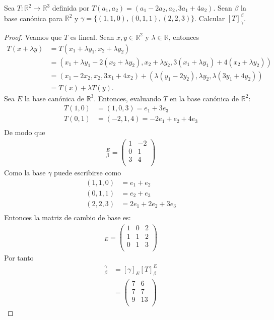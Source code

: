 \documentclass[11pt]{article}
\numberwithin{equation}{section}
\newcommand{\R}{\mathbb{R}}
\begin{document}
\begin{Problema}{} Sea $T: \R^2 \to \R^3$ definida por $T(a_1, a_2) = (a_1 - 2a_2, a_2, 3a_1 + 4a_2)$. 
    Sean $\beta$ la base canónica para $\R^2$ y $\gamma = \{(1,1,0), (0,1,1), (2,2,3)\}$. Calcular $[T]_{\gamma}^\beta$.
\end{Problema}
\begin{proof}
Veamos que $T$ es lineal. Sean $x,y \in \R^2$ y $\lambda \in \R$, entonces
\begin{align*}
    T(x+\lambda y) &=T(x_1+\lambda y_1, x_2 +\lambda y_2) \\
    &= (x_1 + \lambda y_1 - 2(x_2+\lambda y_2), x_2 + \lambda y_2, 3(x_1+\lambda y_1) + 4(x_2+\lambda y_2))\\
    &= (x_1 - 2x_2, x_2, 3x_1 + 4x_2)+(\lambda(y_1-2y_2), \lambda y_2, \lambda(3y_1+4y_2)) \\
    &= T(x) + \lambda T(y).
\end{align*}
Sea $E$ la base canónica de $\R^3$. Entonces, evaluando $T$ en la base canónica de $\R^2$:
\begin{align*}
    T(1,0)&=(1,0,3)=e_1+3e_3\\
    T(0,1)&=(-2,1,4)=-2e_1+e_2+4e_3\\
\end{align*}
De modo que 
\begin{align*}
    [T]_\beta^E=\begin{pmatrix}
        1 & -2 \\
        0 & 1 \\
        3 & 4 \\
    \end{pmatrix}
\end{align*}
Como la base $\gamma$ puede escribirse como 
\begin{align*}
    (1,1,0)&=e_1+e_2 \\
    (0,1,1)&=e_2+e_3 \\
    (2,2,3)&=2e_1+2e_2+3e_3 \\
\end{align*}
Entonces la matriz de cambio de base es:
\begin{align*}
    [\gamma]_{E}=\begin{pmatrix}
        1 & 0 & 2 \\
        1 & 1 & 2 \\
        0 & 1 & 3 \\
    \end{pmatrix}
\end{align*}
Por tanto
\begin{align*}
    [T]_\beta^\gamma&=[\gamma]_{E}[T]_\beta^E\\
    &=\begin{pmatrix}
        7 & 6 \\
        7 & 7 \\
        9 & 13 \\
    \end{pmatrix}
\end{align*}
\end{proof}
\end{document}
